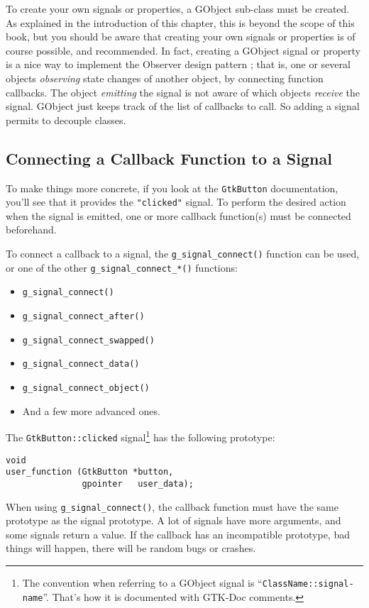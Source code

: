 To create your own signals or properties, a GObject sub-class must be created. As explained in the introduction of this chapter, this is beyond the scope of this book, but you should be aware that creating your own signals or properties is of course possible, and recommended. In fact, creating a GObject signal or property is a nice way to implement the Observer design pattern \cite{design-patterns-book}; that is, one or several objects \emph{observing} state changes of another object, by connecting function callbacks. The object \emph{emitting} the signal is not aware of which objects \emph{receive} the signal. GObject just keeps track of the list of callbacks to call. So adding a signal permits to decouple classes.

\subsection{Connecting a Callback Function to a Signal}

To make things more concrete, if you look at the \lstinline{GtkButton} documentation, you'll see that it provides the \lstinline{"clicked"} signal. To perform the desired action when the signal is emitted, one or more callback function(s) must be connected beforehand.

To connect a callback to a signal, the \lstinline{g_signal_connect()} function can be used, or one of the other \lstinline{g_signal_connect_*()} functions:
\begin{itemize}
  \item \lstinline{g_signal_connect()}
  \item \lstinline{g_signal_connect_after()}
  \item \lstinline{g_signal_connect_swapped()}
  \item \lstinline{g_signal_connect_data()}
  \item \lstinline{g_signal_connect_object()}
  \item And a few more advanced ones.
\end{itemize}

The \lstinline{GtkButton::clicked} signal\footnote{The convention when referring to a GObject signal is ``\lstinline{ClassName::signal-name}''. That's how it is documented with GTK-Doc comments.} has the following prototype:
\begin{lstlisting}
void
user_function (GtkButton *button,
               gpointer   user_data);
\end{lstlisting}

When using \lstinline{g_signal_connect()}, the callback function must have the same prototype as the signal prototype. A lot of signals have more arguments, and some signals return a value. If the callback has an incompatible prototype, bad things will happen, there will be random bugs or crashes.


